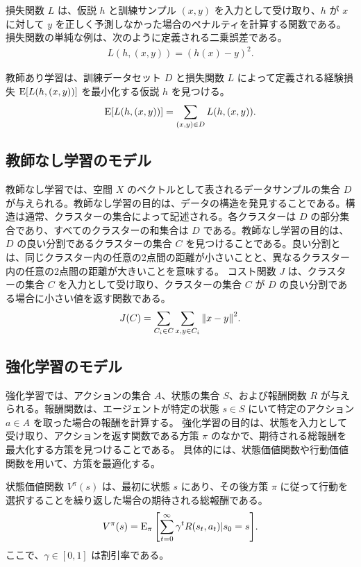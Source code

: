損失関数 $L$ は、仮説 $h$ と訓練サンプル $(x, y)$ を入力として受け取り、$h$ が $x$ に対して $y$ を正しく予測しなかった場合のペナルティを計算する関数である。
損失関数の単純な例は、次のように定義される二乗誤差である。
\begin{align}
    L(h, (x, y)) = (h(x) - y)^2.
\end{align}

教師あり学習は、訓練データセット $D$ と損失関数 $L$ によって定義される経験損失 $\operatorname{E}[L(h, (x, y))]$ を最小化する仮説 $h$ を見つける。
\begin{align}
    \operatorname{E}[L(h, (x, y))] = \sum_{(x, y) \in D} L(h, (x, y)).
\end{align}

\subsection{教師なし学習のモデル}
教師なし学習では、空間 $X$ のベクトルとして表されるデータサンプルの集合 $D$ が与えられる。教師なし学習の目的は、データの構造を発見することである。構造は通常、クラスターの集合によって記述される。各クラスターは $D$ の部分集合であり、すべてのクラスターの和集合は $D$ である。教師なし学習の目的は、$D$ の良い分割であるクラスターの集合 $C$ を見つけることである。良い分割とは、同じクラスター内の任意の2点間の距離が小さいことと、異なるクラスター内の任意の2点間の距離が大きいことを意味する。
コスト関数 $J$ は、クラスターの集合 $C$ を入力として受け取り、クラスターの集合 $C$ が $D$ の良い分割である場合に小さい値を返す関数である。
\begin{align}
    J(C) = \sum_{C_i \in C} \sum_{x, y \in C_i} \norm{x - y}^2.
\end{align}

\subsection{強化学習のモデル}
強化学習では、アクションの集合 $A$、状態の集合 $S$、および報酬関数 $R$ が与えられる。報酬関数は、エージェントが特定の状態 $s \in S$ にいて特定のアクション $a \in A$ を取った場合の報酬を計算する。
強化学習の目的は、状態を入力として受け取り、アクションを返す関数である方策 $\pi$ のなかで、期待される総報酬を最大化する方策を見つけることである。
具体的には、状態価値関数や行動価値関数を用いて、方策を最適化する。

状態価値関数 $V^{\pi}(s)$ は、最初に状態 $s$ にあり、その後方策 $\pi$ に従って行動を選択することを繰り返した場合の期待される総報酬である。
\begin{align}
    V^{\pi}(s) = \operatorname{E}_{\pi}\qty[\sum_{t=0}^{\infty} \gamma^t R(s_t, a_t) | s_0 = s].
\end{align}
ここで、$\gamma \in [0, 1]$ は割引率である。

